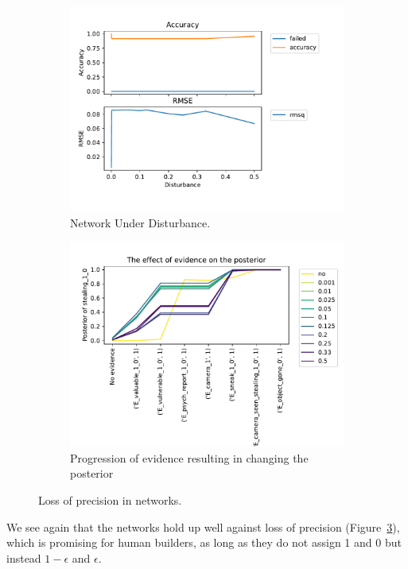 \begin{enumerate}
\begin{figure}[htbp]
\begin{center}
\begin{subfigure}{.5\textwidth}
\includegraphics[width=0.9\linewidth]{../experiments/GroteMarkt/plots/performance_GroteMarkt.pdf}
\caption{Network Under Disturbance.}
\label{dist}
\end{subfigure}%
\begin{subfigure}{.5\textwidth}
\includegraphics[width=0.9\linewidth]{../experiments/GroteMarkt/plots/posterior_GroteMarkt.pdf}
\caption{ Progression of evidence resulting in changing the posterior}
\label{post}
\end{subfigure}
\end{center}
\caption{Loss of precision in networks.}
\label{pLoss}
\end{figure}

We see again that the networks hold up well against loss of precision (Figure~\ref{pLoss}), which is promising for human builders, as long as they do not assign 1 and 0 but instead $1 - \epsilon$ and $\epsilon$.

\end{enumerate}

